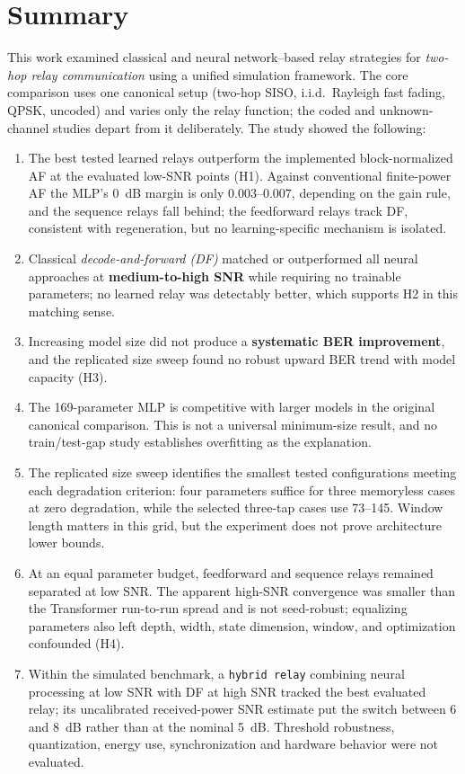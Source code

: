 \chapter{Summary}\label{sec:summary}

This work examined classical and neural network–based relay strategies for \textit{two-hop relay communication} using a unified simulation framework.
The core comparison uses one canonical setup (two-hop SISO, i.i.d.\ Rayleigh fast fading, QPSK, uncoded) and varies only the relay function; the coded and unknown-channel studies depart from it deliberately. The study showed the following:

\begin{enumerate}
    \item The best tested learned relays outperform the implemented block-normalized AF at the evaluated low-SNR points (H1). Against conventional finite-power AF the MLP's 0~dB margin is only $0.003$--$0.007$, depending on the gain rule, and the sequence relays fall behind; the feedforward relays track DF, consistent with regeneration, but no learning-specific mechanism is isolated.
    \item Classical \textit{decode-and-forward (DF)} matched or outperformed all neural approaches at \textbf{medium-to-high SNR} while requiring no trainable parameters; no learned relay was detectably better, which supports H2 in this matching sense.
    \item Increasing model size did not produce a \textbf{systematic BER improvement}, and the replicated size sweep found no robust upward BER trend with model capacity (H3).
    \item The 169-parameter MLP is competitive with larger models in the original canonical comparison. This is not a universal minimum-size result, and no train/test-gap study establishes overfitting as the explanation.
    \item The replicated size sweep identifies the smallest tested configurations meeting each degradation criterion: four parameters suffice for three memoryless cases at zero degradation, while the selected three-tap cases use 73--145. Window length matters in this grid, but the experiment does not prove architecture lower bounds.
    \item At an equal parameter budget, feedforward and sequence relays remained separated at low SNR. The apparent high-SNR convergence was smaller than the Transformer run-to-run spread and is not seed-robust; equalizing parameters also left depth, width, state dimension, window, and optimization confounded (H4).
    \item Within the simulated benchmark, a \texttt{hybrid relay} combining neural processing at low SNR with DF at high SNR tracked the best evaluated relay; its uncalibrated received-power SNR estimate put the switch between 6 and 8~dB rather than at the nominal 5~dB. Threshold robustness, quantization, energy use, synchronization and hardware behavior were not evaluated.
\end{enumerate}
